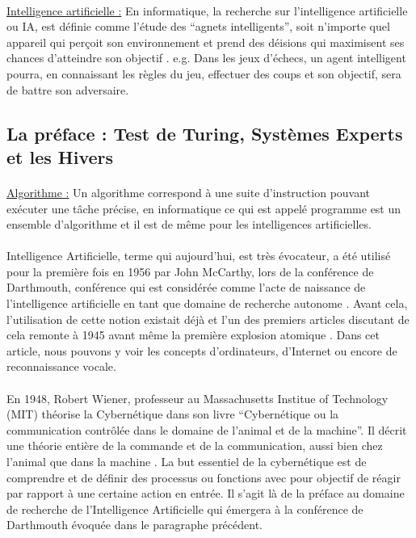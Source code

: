 \documentclass[10pt, french, a4paper]{report}
\begin{document}
\paragraph{}
\underline{Intelligence artificielle :} En informatique, la recherche sur l'intelligence artificielle ou IA, est définie comme l'étude des ``agnets intelligents'', soit n'importe quel appareil qui perçoit son environnement et prend des déisions qui maximisent ses chances d'atteindre son objectif \citep{poole_computational_1997}. e.g. Dans les jeux d’échecs, un agent intelligent pourra, en connaissant les règles du jeu, effectuer des coups et son objectif, sera de battre son adversaire.

\subsection{La préface : Test de Turing, Systèmes Experts et les Hivers}

\paragraph{}\underline{Algorithme :} Un algorithme correspond à une suite d'instruction pouvant exécuter une tâche précise, en informatique ce qui est appelé programme est un ensemble d'algorithme et il est de même pour les intelligences artificielles.

\paragraph{}
Intelligence Artificielle, terme qui aujourd’hui, est très évocateur, a été utilisé pour la première fois en 1956 par John McCarthy, lors de la conférence de Darthmouth, conférence qui est considérée comme l’acte de naissance de l’intelligence artificielle en tant que domaine de recherche autonome \citep{solomonoff_time_1985}. Avant cela, l'utilisation de cette notion existait déjà et l'un des premiers articles discutant de cela remonte à 1945 avant même la première explosion atomique \citep{bush_as_1945}. Dans cet article, nous pouvons y voir les concepts d'ordinateurs, d'Internet ou encore de reconnaissance vocale.

\paragraph{}
En 1948, Robert Wiener, professeur au Massachusetts Institue of Technology (MIT) théorise la Cybernétique dans son livre ``Cybernétique ou la communication contrôlée dans le domaine de l'animal et de la machine''. Il décrit une théorie entière de la commande et de la communication, aussi bien chez l'animal que dans la machine \citep{wiener_cybernetics;_1961}. La but essentiel de la cybernétique est de comprendre et de définir des processus ou fonctions avec pour objectif de réagir par rapport à une certaine action en entrée. Il s'agit là de la préface au domaine de recherche de l'Intelligence Artificielle qui émergera à la conférence de Darthmouth évoquée dans le paragraphe précédent.
\end{document}
